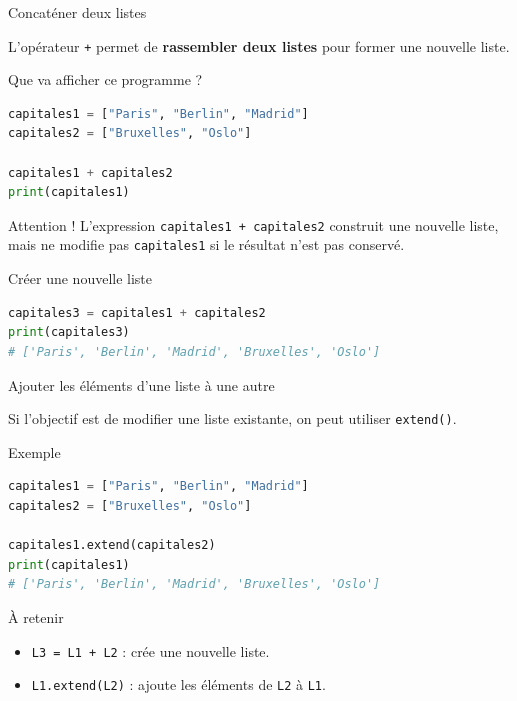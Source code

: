 \documentclass[10pt]{beamer}
\begin{document}
\begin{frame}[fragile]{Concaténer deux listes}

L'opérateur \texttt{+} permet de \textbf{rassembler deux listes}
pour former une nouvelle liste.

\begin{exampleblock}{Que va afficher ce programme ?}
\begin{lstlisting}[language=Python]
capitales1 = ["Paris", "Berlin", "Madrid"]
capitales2 = ["Bruxelles", "Oslo"]

capitales1 + capitales2
print(capitales1)
\end{lstlisting}
\end{exampleblock}

\pause

\begin{alertblock}{Attention !}
L'expression \texttt{capitales1 + capitales2} construit une nouvelle liste,
mais ne modifie pas \texttt{capitales1} si le résultat n'est pas conservé.
\end{alertblock}

\pause

\begin{exampleblock}{Créer une nouvelle liste}
\begin{lstlisting}[language=Python]
capitales3 = capitales1 + capitales2
print(capitales3)
# ['Paris', 'Berlin', 'Madrid', 'Bruxelles', 'Oslo']
\end{lstlisting}
\end{exampleblock}

\end{frame}


\begin{frame}[fragile]{Ajouter les éléments d'une liste à une autre}

Si l'objectif est de modifier une liste existante, on peut utiliser
\texttt{extend()}.

\begin{exampleblock}{Exemple}
\begin{lstlisting}[language=Python]
capitales1 = ["Paris", "Berlin", "Madrid"]
capitales2 = ["Bruxelles", "Oslo"]

capitales1.extend(capitales2)
print(capitales1)
# ['Paris', 'Berlin', 'Madrid', 'Bruxelles', 'Oslo']
\end{lstlisting}
\end{exampleblock}

\begin{block}{À retenir}
\begin{itemize}
    \item \texttt{L3 = L1 + L2} : crée une nouvelle liste.
    \item \texttt{L1.extend(L2)} : ajoute les éléments de \texttt{L2} à \texttt{L1}.
\end{itemize}
\end{block}

\end{frame}
\end{document}
